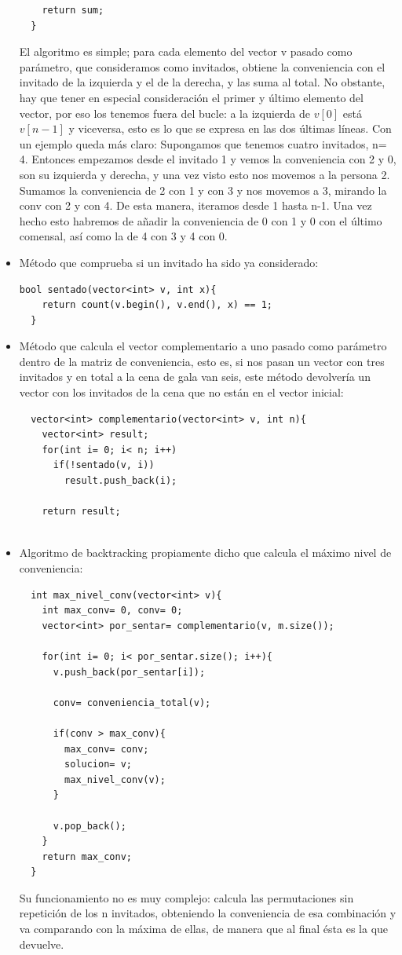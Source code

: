 \documentclass[12pt]{article}
\begin{document}
\begin{itemize}[wide, nosep, labelindent = 0pt, topsep = 1ex]
\begin{lstlisting}
    return sum;
  }
\end{lstlisting}
El algoritmo es simple; para cada elemento del vector v pasado como parámetro, que consideramos como invitados, obtiene la conveniencia con el invitado de la izquierda y el de la derecha, y las suma al total. No obstante, hay que tener en especial consideración el primer y último elemento del vector, por eso los tenemos fuera del bucle: a la izquierda de $v[0]$ está $v[n-1]$ y viceversa, esto es lo que se expresa en las dos últimas líneas. Con un ejemplo queda más claro: Supongamos que tenemos cuatro invitados, n= 4. Entonces empezamos desde el invitado 1 y vemos la conveniencia con 2 y 0, son su izquierda y derecha, y una vez visto esto nos movemos a la persona 2. Sumamos la conveniencia de 2 con 1 y con 3 y nos movemos a 3, mirando la conv con 2 y con 4. De esta manera, iteramos desde 1 hasta n-1. Una vez hecho esto habremos de añadir la conveniencia de 0 con 1 y 0 con el último comensal, así como la de 4 con 3 y 4 con 0. 

\item Método que comprueba si un invitado ha sido ya considerado:
\begin{lstlisting}
bool sentado(vector<int> v, int x){
    return count(v.begin(), v.end(), x) == 1;
  }
\end{lstlisting}

\item Método que calcula el vector complementario a uno pasado como parámetro dentro de la matriz de conveniencia, esto es, si nos pasan un vector con tres invitados y en total a la cena de gala van seis, este método devolvería un vector con los invitados de la cena que no están en el vector inicial:
\begin{lstlisting}
  vector<int> complementario(vector<int> v, int n){
    vector<int> result;
    for(int i= 0; i< n; i++)
      if(!sentado(v, i))
        result.push_back(i);

    return result;
  
\end{lstlisting}

\item Algoritmo de backtracking propiamente dicho que calcula el máximo nivel de conveniencia: 
\begin{lstlisting}
  int max_nivel_conv(vector<int> v){
    int max_conv= 0, conv= 0;
    vector<int> por_sentar= complementario(v, m.size());

    for(int i= 0; i< por_sentar.size(); i++){
      v.push_back(por_sentar[i]);

      conv= conveniencia_total(v);

      if(conv > max_conv){
        max_conv= conv;
        solucion= v;
        max_nivel_conv(v);
      }

      v.pop_back();
    }
    return max_conv;
  }
\end{lstlisting}
Su funcionamiento no es muy complejo: calcula las permutaciones sin repetición de los n invitados, obteniendo la conveniencia de esa combinación y va comparando con la máxima de ellas, de manera que al final ésta es la que devuelve.
\end{itemize}
\end{document}
